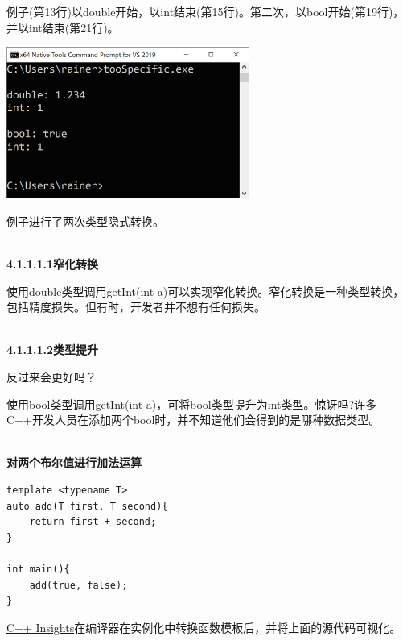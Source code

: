 例子(第13行)以double开始，以int结束(第15行)。第二次，以bool开始(第19行)，并以int结束(第21行)。

\begin{center}
\includegraphics[width=0.6\textwidth]{content/3/chapter4/images/3.png}\\
\end{center}

例子进行了两次类型隐式转换。

\hspace*{\fill} \\ %
\noindent
\textbf{4.1.1.1.1\hspace{0.2cm}窄化转换}

使用double类型调用getInt(int a)可以实现窄化转换。窄化转换是一种类型转换，包括精度损失。但有时，开发者并不想有任何损失。

\hspace*{\fill} \\ %
\noindent
\textbf{4.1.1.1.2\hspace{0.2cm}类型提升}

反过来会更好吗？

使用bool类型调用getInt(int a)，可将bool类型提升为int类型。惊讶吗?许多C++开发人员在添加两个bool时，并不知道他们会得到的是哪种数据类型。

\hspace*{\fill} \\ %
\noindent
\textbf{对两个布尔值进行加法运算}
\begin{lstlisting}[style=styleCXX]
template <typename T>
auto add(T first, T second){
	return first + second;
}

int main(){
	add(true, false);
}
\end{lstlisting}

\href{https://cppinsights.io/s/9bd14f99}{C++ Insights}在编译器在实例化中转换函数模板后，并将上面的源代码可视化。

